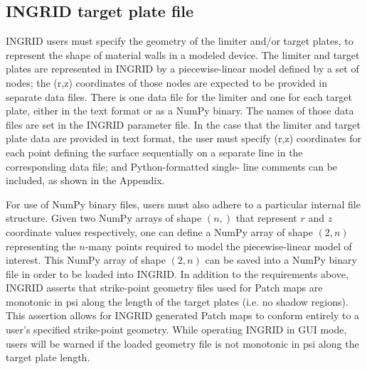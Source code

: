 \subsection{INGRID target plate file}

INGRID users must specify the geometry of the limiter and/or target
plates, to represent the shape of material walls in a modeled
device. The limiter and target plates are represented in INGRID by a
piecewise-linear model defined by a set of nodes; the (r,z)
coordinates of those nodes are expected to be provided in separate
data files. There is one data file for the limiter and one for each
target plate, either in the text format or as a NumPy binary. The
names of those data files are set in the INGRID parameter file. In the
case that the limiter and target plate data are provided in text
format, the user must specify (r,z) coordinates for each point
defining the surface sequentially on a separate line in the
corresponding data file; and Python-formatted single- line comments
can be included, as shown in the Appendix.

For use of NumPy binary files, users must also adhere to a particular
internal file structure. Given two NumPy arrays of shape $(n, )$ that
represent $r$ and $z$ coordinate values respectively, one can define a
NumPy array of shape $(2,n)$ representing the $n$-many points required
to model the piecewise-linear model of interest. This NumPy array of
shape $(2, n)$ can be saved into a NumPy binary file in order to be
loaded into INGRID.  In addition to the requirements above, INGRID
asserts that strike-point geometry files used for Patch maps are
monotonic in psi along the length of the target plates (i.e. no shadow
regions). This assertion allows for INGRID generated Patch maps to
conform entirely to a user's specified strike-point geometry. While
operating INGRID in GUI mode, users will be warned if the loaded
geometry file is not monotonic in psi along the target plate length.
